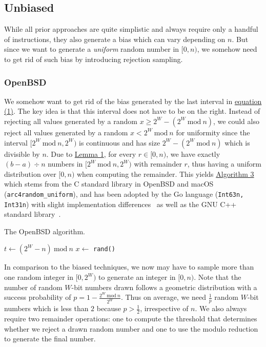 \documentclass[a4paper, UKenglish, cleveref, autoref, thm-restate]{lipics-v2021}
\newcommand{\Mod}[1]{\ \mathrm{mod}\ #1}
\begin{document}
\subsection{Unbiased}
While all prior approaches are quite simplistic and always require only a handful of instructions, they also generate a bias which can vary depending on $n$.
But since we want to generate a \emph{uniform} random number in $[0,n)$, we somehow need to get rid of such bias by introducing rejection sampling.

\subsubsection{OpenBSD}\label{sec:2.2.1}
We somehow want to get rid of the bias generated by the last interval in \hyperref[eq:1]{equation (1)}.
The key idea is that this interval does not have to be on the right.
Instead of rejecting all values generated by a random $x \geq 2^W - (2^W \Mod n)$, we could also reject all values generated by a random $x < 2^W \Mod n$ for uniformity since the interval $[2^W \Mod n, 2^W)$ is continuous and has size $2^W - (2^W \Mod n)$ which is divisible by $n$.
Due to \hyperref[lemma:1]{Lemma 1}, for every $r \in [0,n)$, we have exactly $(b - a) \div n$ numbers in $[2^W \Mod n,2^W)$ with remainder $r$, thus having a uniform distribution over $[0,n)$ when computing the remainder.
This yields \hyperref[alg:openbsd]{Algorithm 3} which stems from the C standard library in OpenBSD and macOS (\texttt{arc4random\_uniform}), and has been adopted by the Go language (\texttt{Int63n, Int31n}) with slight implementation differences~\cite{GoLang} as well as the GNU C++ standard library~\cite{GnuCpp}.

\begin{algorithm}[!htb] \label{alg:openbsd}
    \caption{The OpenBSD algorithm.}
    \Require{source of uniformly-distributed random integers in $[0,2^W)$ given by \texttt{rand()}}
    $t \leftarrow \left(2^W - n\right) \Mod n$\tcc*[r]{$ \left(2^W - n\right) \Mod n \equiv 2^W \Mod n$}
    $x \leftarrow$ \texttt{rand()}\;
    \KwRet{$x \Mod n$}\;
\end{algorithm}

In comparison to the biased techniques, we now may have to sample more than one random integer in $[0,2^W)$ to generate an integer in $[0,n)$.
Note that the number of random $W$-bit numbers drawn follows a geometric distribution with a success probability of $p = 1 - \frac{2^W \Mod n}{2^W}$.
Thus on average, we need $\frac{1}{p}$ random $W$-bit numbers which is less than $2$ because $p > \frac{1}{2}$, irrespective of $n$.
We also always require two remainder operations: one to compute the threshold that determines whether we reject a drawn random number and one to use the modulo reduction to generate the final number.
\end{document}
